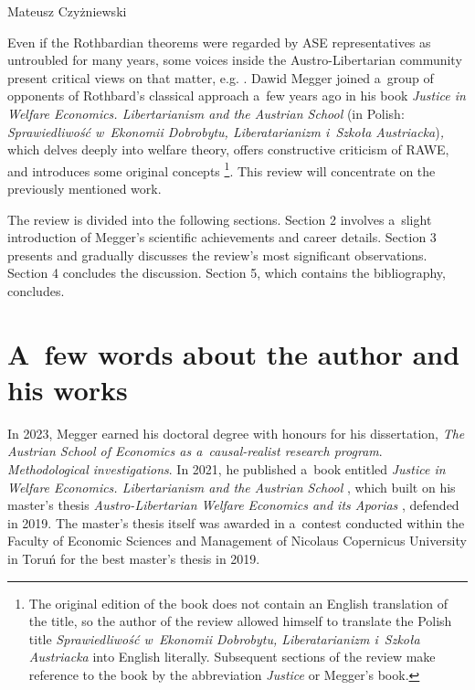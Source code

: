 \begin{newrevengenv}{Mateusz Czyżniewski}
\begin{enumerate}
\end{enumerate}

Even if the Rothbardian theorems were regarded by ASE representatives as untroubled for many years, some voices inside the Austro-Libertarian community present critical views on that matter, e.g. 
\parencites[][]{prychitko_formalism_1993}[][]{gunning_did_2005}[][]{kvasnicka_rothbards_2008}[][]{wysocki_how_2023}[][]{wysocki_how_2023}. %
 Dawid Megger joined a~group of opponents of Rothbard's classical approach a~few years ago in his book \textit{Justice in Welfare Economics. Libertarianism and the Austrian School} (in Polish: \textit{Sprawiedliwość w~Ekonomii Dobrobytu, Liberatarianizm i~Szkoła Austriacka})\textit{,} which delves deeply into welfare theory, offers constructive criticism of RAWE, and introduces some original concepts 
\parencite[][]{megger_sprawiedliwosc_2021}%
\footnote{The original edition of the book does not contain an English translation of the title, so the author of the review allowed himself to translate the Polish title \textit{Sprawiedliwość w~Ekonomii Dobrobytu, Liberatarianizm i~Szkoła Austriacka} into English literally. Subsequent sections of the review make reference to the book by the abbreviation \textit{Justice} or Megger's book.}. This review will concentrate on the previously mentioned work.



The review is divided into the following sections. Section 2 involves a~slight introduction of Megger's scientific achievements and career details. Section 3 presents and gradually discusses the review's most significant observations. Section 4 concludes the discussion. Section 5, which contains the bibliography, concludes.



\section{A~few words about the author and his works}

In 2023, Megger earned his doctoral degree with honours for his dissertation, \textit{The Austrian School of Economics as a~causal-realist research program}. \textit{Methodological investigations}. In 2021, he published a~book entitled \textit{Justice in Welfare Economics. Libertarianism and the Austrian School} 
\parencite[][]{megger_sprawiedliwosc_2021}, %
 which built on his master's thesis \textit{Austro-Libertarian Welfare Economics and its Aporias} 
\parencite[][]{megger_austriacka_2023}, %
 defended in 2019. The master's thesis itself was awarded in a~contest conducted within the Faculty of Economic Sciences and Management of Nicolaus Copernicus University in Toruń for the best master's thesis in 2019.




\end{newrevengenv}
